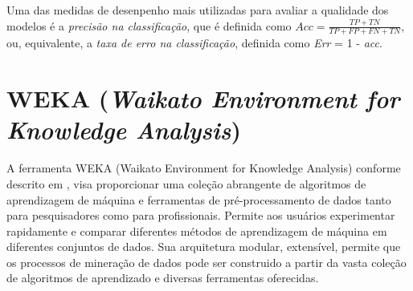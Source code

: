 \documentclass[
	12pt,				%
	openright,			%
	oneside,	
	a4paper,				%
	english,				%
	brazil				%
]{abntex2/abntex2} %
\begin{document}
		Uma das medidas de desenpenho  mais utilizadas para avaliar a qualidade dos modelos é a \textit{precisão na classificação}, que é definida como $Acc = \frac{TP + TN}{TP + FP + FN + TN} $, ou, equivalente, a \textit{taxa de erro na classificação}, definida como \textit{Err} = 1 - \textit{acc}.
	
		

	\section{WEKA (\textit{Waikato Environment for Knowledge Analysis})}
	
	A ferramenta WEKA (Waikato Environment for Knowledge Analysis)  conforme descrito em \cite{hall:2009}, visa proporcionar uma coleção abrangente de algoritmos de aprendizagem de máquina e ferramentas de pré-processamento de dados tanto para pesquisadores como para profissionais. Permite aos usuários experimentar rapidamente e comparar diferentes métodos de aprendizagem de máquina em diferentes conjuntos de dados. Sua arquitetura modular, extensível, permite que os processos de mineração de dados pode ser construido a partir da vasta coleção de algoritmos de aprendizado e diversas ferramentas oferecidas.
		
\end{document}
